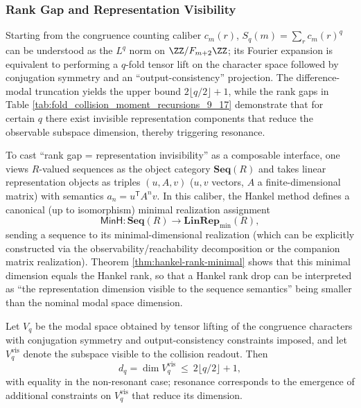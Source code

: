 \subsubsection{Rank Gap and Representation Visibility}\label{subsec:pom-moment-visibility}
Starting from the congruence counting caliber \(c_m(r)\), \(S_q(m)=\sum_r c_m(r)^q\) can be understood as the \(L^q\) norm on \(\ZZ/F_{m+2}\ZZ\); its Fourier expansion is equivalent to performing a \(q\)-fold tensor lift on the character space followed by conjugation symmetry and an ``output-consistency'' projection. The difference-modal truncation yields the upper bound \(2\lfloor q/2\rfloor+1\), while the rank gaps in Table \ref{tab:fold_collision_moment_recursions_9_17} demonstrate that for certain \(q\) there exist invisible representation components that reduce the observable subspace dimension, thereby triggering resonance.

\begin{remark}\label{rem:pom-minh-functor}
To cast ``rank gap = representation invisibility'' as a composable interface, one views \(R\)-valued sequences as the object category \(\mathbf{Seq}(R)\) and takes linear representation objects as triples \((u,A,v)\) (\(u,v\) vectors, \(A\) a finite-dimensional matrix) with semantics
\(
a_n=u^{\mathsf T}A^n v
\).
In this caliber, the Hankel method defines a canonical (up to isomorphism) minimal realization assignment
\[
\mathsf{MinH}:\mathbf{Seq}(R)\to \mathbf{LinRep}_{\min}(R),
\]
sending a sequence to its minimal-dimensional realization (which can be explicitly constructed via the observability/reachability decomposition or the companion matrix realization).
Theorem \ref{thm:hankel-rank-minimal} shows that this minimal dimension equals the Hankel rank, so that a Hankel rank drop can be interpreted as ``the representation dimension visible to the sequence semantics'' being smaller than the nominal modal space dimension.
\end{remark}

\begin{conjecture}\label{conj:pom-moment-visible}
Let \(V_q\) be the modal space obtained by tensor lifting of the congruence characters with conjugation symmetry and output-consistency constraints imposed, and let \(V_q^{\mathrm{vis}}\) denote the subspace visible to the collision readout. Then
\[
d_q=\dim V_q^{\mathrm{vis}}\ \le\ 2\lfloor q/2\rfloor+1,
\]
with equality in the non-resonant case; resonance corresponds to the emergence of additional constraints on \(V_q^{\mathrm{vis}}\) that reduce its dimension.
\end{conjecture}

